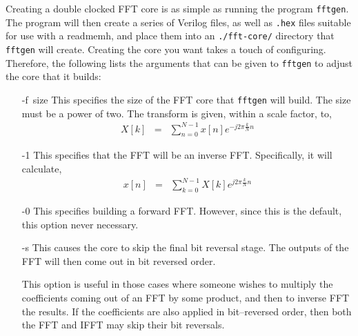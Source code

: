 \documentclass{gqtekspec}
\begin{document}
Creating a double clocked FFT core is as simple as running the program
{\tt fftgen}.  The program will then create a series of Verilog files, as
well as {\tt .hex} files suitable for use with a \textdollar readmemh, and
place them into an {\tt ./fft-core/} directory that {\tt fftgen} will create.
Creating the core you want takes a touch of configuring.
Therefore, the following lists the arguments that can be given to 
{\tt fftgen} to adjust the core that it builds:
\begin{itemize}
\item[\hbox{-f size}]
	This specifies the size of the FFT core that {\tt fftgen} will build.
	The size must be a power of two.  The transform is given, within a
	scale factor, to,
	\begin{eqnarray*}
	X\left[k\right] &=& \sum_{n=0}^{N-1} x\left[n\right]
		e^{-j2\pi \frac{k}{N}n}
	\end{eqnarray*}

\item[\hbox{-1}]
	This specifies that the FFT will be an inverse FFT.  Specifically,
	it will calculate,
	\begin{eqnarray*}
	x\left[n\right] &=& \sum_{k=0}^{N-1} X\left[k\right] e^{j2\pi \frac{k}{N}n}
	\end{eqnarray*}
\item[\hbox{-0}]
	This specifies building a forward FFT.  However, since this is the
	default, this option never necessary.
\item[\hbox{-s}]
	This causes the core to skip the final bit reversal stage.  The 
	outputs of the FFT will then come out in bit reversed order.

	This option is useful in those cases where someone wishes to 
	multiply the coefficients coming out of an FFT by some product,
	and then to inverse FFT the results.  If the coefficients are also
	applied in bit--reversed order, then both the FFT and IFFT may
	skip their bit reversals.


\end{itemize}
\end{document}
